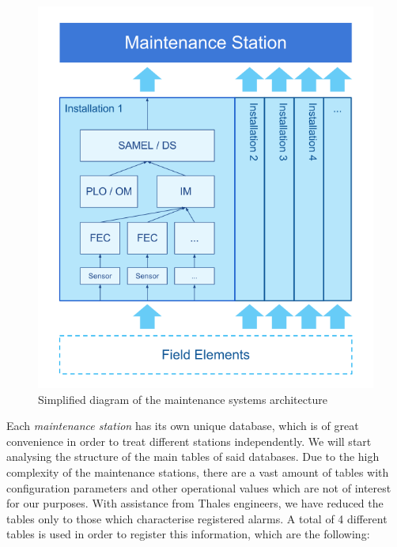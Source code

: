 \documentclass[a4paper,12pt]{article}
\begin{document}
\begin{figure}[hbt]
\includegraphics[width=\textwidth]{./img/arch_stations.png}
\caption{Simplified diagram of the maintenance systems architecture} \label{fig:arch_stations}
\end{figure}

Each \emph{maintenance station} has its own unique database, which is of great convenience in order to treat different stations independently. We will start analysing the structure of the main tables of said databases. Due to the high complexity of the maintenance stations, there are a vast amount of tables with configuration parameters and other operational values which are not of interest for our purposes. With assistance from Thales engineers, we have reduced the tables only to those which characterise registered alarms. A total of 4 different tables is used in order to register this information, which are the following:
\end{document}
